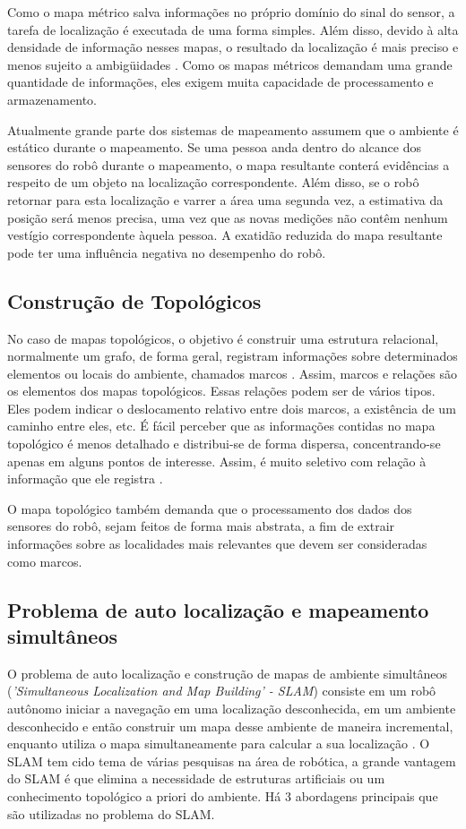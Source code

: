 \documentclass[12pt]{article}
\begin{document}
Como o mapa métrico salva informações no próprio domínio do sinal do sensor, a
tarefa de localização é executada de uma forma simples. Além disso, devido à alta
densidade de informação nesses mapas, o resultado da localização é mais preciso e
menos sujeito a ambigüidades \cite{construcaoMapas2}. Como os mapas métricos 
demandam uma grande quantidade de informações, eles exigem muita capacidade de processamento e 
armazenamento.

Atualmente grande parte dos sistemas de mapeamento assumem que o ambiente é estático
durante o mapeamento. Se uma pessoa anda dentro do alcance dos sensores do robô durante o
mapeamento, o mapa resultante conterá evidências a respeito de um objeto na localização
correspondente. Além disso, se o robô retornar para esta localização e varrer a área uma
segunda vez, a estimativa da posição será menos precisa, uma vez que as novas medições não
contêm nenhum vestígio correspondente àquela pessoa. A exatidão reduzida do mapa
resultante pode ter uma influência negativa no desempenho do robô.

\subsection{Construção de Topológicos}
No caso de mapas topológicos, o objetivo é construir uma estrutura relacional, normalmente um grafo, 
de forma geral, registram informações sobre determinados
elementos ou locais do ambiente, chamados marcos \cite{construcaoMapas2}. Assim, marcos e relações são
os elementos dos mapas topológicos.
Essas relações podem ser de vários tipos. Eles podem indicar o deslocamento
relativo entre dois marcos, a existência de um caminho entre eles, etc. É fácil perceber que as informações contidas no mapa topológico é
menos detalhado e distribui-se de forma dispersa, concentrando-se apenas em alguns pontos de interesse.
Assim, é muito seletivo com relação à informação que ele registra \cite{construcaoMapas2}. 

O mapa topológico também demanda que o processamento
dos dados dos sensores do robô, sejam feitos de forma mais abstrata, a fim de extrair informações sobre as localidades mais relevantes que devem ser consideradas
como marcos.

\subsection{Problema de auto localização e mapeamento simultâneos}
  O problema de auto localização e construção de mapas de ambiente simultâneos (\textit{'Simultaneous Localization and
Map Building' - SLAM}) consiste em um robô autônomo iniciar a navegação
em uma localização desconhecida, em um ambiente desconhecido e então construir um mapa
desse ambiente de maneira incremental, enquanto utiliza o mapa simultaneamente para calcular a sua localização \cite{slam}.
 O SLAM tem cido tema de várias pesquisas na área de robótica, a grande vantagem do SLAM é que elimina a necessidade de estruturas artificiais ou
um conhecimento topológico a priori do ambiente. Há 3 abordagens principais que são utilizadas no problema do SLAM. 
\end{document}
